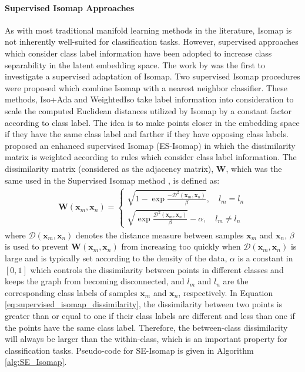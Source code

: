 \paragraph{Supervised Isomap Approaches}
As with most traditional manifold learning methods in the literature, Isomap is not inherently well-suited for classification tasks.  However, supervised approaches which consider class label information have been adopted to increase class separability in the latent embedding space. The work by \cite{Vlachos2002NonlinearDRClassification} was the first to investigate a supervised adaptation of Isomap.  Two supervised Isomap procedures were proposed which combine Isomap with a nearest neighbor classifier. These methods, Iso+Ada and WeightedIso take label information into consideration to scale the computed Euclidean distances utilized by Isomap by a constant factor according to class label. The idea is to make points closer in the embedding space if they have the same class label and farther if they have opposing class labels.  \cite{Ribeiro2008SupervisedIsomap} proposed an enhanced supervised Isomap (ES-Isomap) in which the dissimilarity matrix is weighted according to rules which consider class label information.  The dissimilarity matrix (considered as the adjacency matrix), $\bm{W}$, which was the same used in the Supervised Isomap method \citep{Geng2005SupNonlinearDimRed}, is defined as:
\begin{align}
	\bm{W}(\bm{x}_{m},\bm{x}_{n}) = \begin{cases} \sqrt{1 - \exp{\frac{-\mathcal{D}^{2}(\bm{x}_{m},\bm{x}_{n})}{\beta}}}, \quad l_m = l_n \\  \sqrt{ \exp{\frac{\mathcal{D}^{2}(\bm{x}_{m},\bm{x}_{n})}{\beta}}} - \alpha, \quad l_m \neq l_n\end{cases}
	\label{eq:supervised_isomap_dissimilarity}
\end{align}
\noindent
where $\mathcal{D}(\bm{x}_{m},\bm{x}_{n})$ denotes the distance measure between samples $\bm{x}_{m}$ and $\bm{x}_{n}$, $\beta$ is used to prevent $\bm{W}(\bm{x}_{m},\bm{x}_{n})$ from increasing too quickly when $\mathcal{D}(\bm{x}_{m},\bm{x}_{n})$ is large and is typically set according to the density of the data, $\alpha$ is a constant in $[0,1]$ which controls the dissimilarity between points in different classes and keeps the graph from becoming disconnected, and $l_{m}$ and $l_{n}$ are the corresponding class labels of samples  $\bm{x}_{m}$ and $\bm{x}_{n}$, respectively.  In Equation \ref{eq:supervised_isomap_dissimilarity}, the dissimilarity between two points is greater than or equal to one if their class labels are different and less than one if the points have the same class label.  Therefore, the between-class dissimilarity will always be larger than the within-class, which is an important property for classification tasks.  Pseudo-code for SE-Isomap is given in Algorithm \ref{alg:SE_Isomap}.

